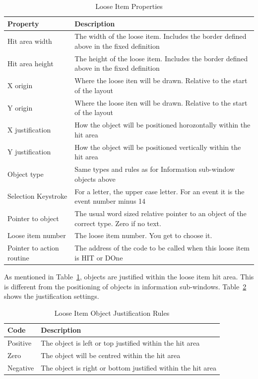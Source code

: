 \begin{table}[htbp]
\centering
\begin{tabular}{p{} p{}}
\toprule
\textbf{Property} & \textbf{Description} \\
\midrule
%
Hit area width            & The width of the loose item. Includes the border defined above in the fixed definition \\
Hit area height           & The height of the loose item. Includes the border defined above in the fixed definition \\
X origin                  & Where the loose iten will be drawn. Relative to the start of the layout \\
Y origin                  & Where the loose iten will be drawn. Relative to the start of the layout \\
X justification           & How the object will be positioned horozontally within the hit area \\
Y justification           & How the object will be positioned vertically within the hit area \\
Object type               & Same types and rules as for Information sub-window objects above \\
Selection Keystroke       & For a letter, the upper case letter. For an event it is the event number minus 14 \\
Pointer to object         & The usual word sized relative pointer to an object of the correct type. Zero if no text. \\
Loose item number         & The loose item number. You get to choose it. \\
Pointer to action routine & The address of the code to be called when this loose item is HIT or DOne \\
%
\bottomrule
\end{tabular}
\caption{Loose Item Properties}
\label{tab:LooseItemProperties}
\end{table}

As mentioned in Table~\ref{tab:LooseItemProperties}, objects are justified within the loose item hit
area. This is different from the positioning of objects in information sub-{}windows. Table~\ref{tab:LooseItemObjectJustificationRules} shows the justification settings.

\begin{table}[htbp]
\centering
\begin{tabular}{l p{}}
\toprule
\textbf{Code} & \textbf{Description} \\
\midrule
%
Positive & The object is left or top justified within the hit area \\
Zero     & The object will be centred within the hit area \\
Negative & The object is right or bottom justified within the hit area \\
%
\bottomrule
\end{tabular}
\caption{Loose Item Object Justification Rules}
\label{tab:LooseItemObjectJustificationRules}
\end{table}

